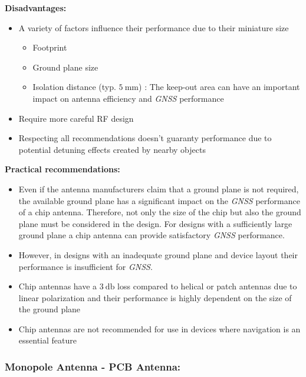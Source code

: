 \documentclass[report.tex]{subfiles}
\begin{document}
\begin{flushleft}
\textbf{Disadvantages:}
\end{flushleft}
\begin{itemize}
\item A variety of factors influence their performance due to their miniature size
\begin{itemize}
\item Footprint
\item Ground plane size
\item Isolation distance (typ. $\SI{5}{\milli\meter}$) : The keep-out area can have an important impact on antenna efficiency and \textit{GNSS} performance
\end{itemize}
\item Require more careful RF design
\item Respecting all recommendations doesn't guaranty performance due to potential detuning effects created by nearby objects
\end{itemize}

\begin{flushleft}
\textbf{Practical recommendations:}
\end{flushleft}
\begin{itemize}
\item Even if the antenna manufacturers claim that a ground plane is not required, the available ground plane has a significant impact on the \textit{GNSS} performance of a chip antenna. Therefore, not only the size of the chip but also the ground plane must be considered in the design. For designs with a sufficiently large ground plane a chip antenna can provide satisfactory \textit{GNSS} performance. 
\item  However, in designs with an inadequate ground plane and device layout their performance is insufficient for \textit{GNSS}.
\item  Chip antennas have a $\SI{3}{\decibel}$ loss compared to helical or patch antennas due to linear polarization and their performance is highly dependent on the size of the ground plane
\item  Chip antennas are not recommended for use in devices where navigation is an essential feature
\end{itemize}

\subsubsection{Monopole Antenna - PCB Antenna:}
\end{document}
